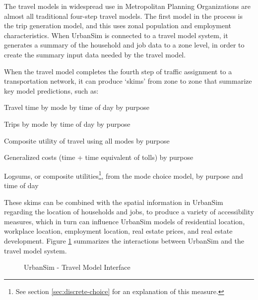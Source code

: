 The travel models in widespread use in Metropolitan Planning Organizations are
almost all traditional four-step travel models.  The first model in the process
is the trip generation model, and this uses zonal population and employment
characteristics.  When UrbanSim is connected to a travel model system,
it generates a summary of the household and job data to a zone level, in order
to create the summary input data needed by the travel model.

When the travel model completes the fourth step of traffic assignment to a
transportation network, it can produce `skims' from zone to zone that summarize
key model predictions, such as:

\squishlist
\item   Travel time by mode by time of day by purpose
\item Trips by mode by time of day by purpose
\item   Composite utility of travel using all modes by purpose
\item Generalized costs (time + time equivalent of tolls) by purpose
\item Logsums, or composite utilities\footnote{See section \ref{sec:discrete-choice} for an explanation of this measure.}, from the mode choice model, by purpose and time of day
\squishend

These skims can be combined with the spatial information in UrbanSim regarding the location of households and jobs, to produce
a variety of accessibility measures, which in turn can influence UrbanSim models of residential location, workplace location, employment
location, real estate prices, and real estate development.  Figure \ref{fig:TMinterface} summarizes the interactions between UrbanSim and
the travel model system.

\begin{figure}[ht]
\center {}
\caption{UrbanSim - Travel Model Interface} \label{fig:TMinterface}
\end{figure}

